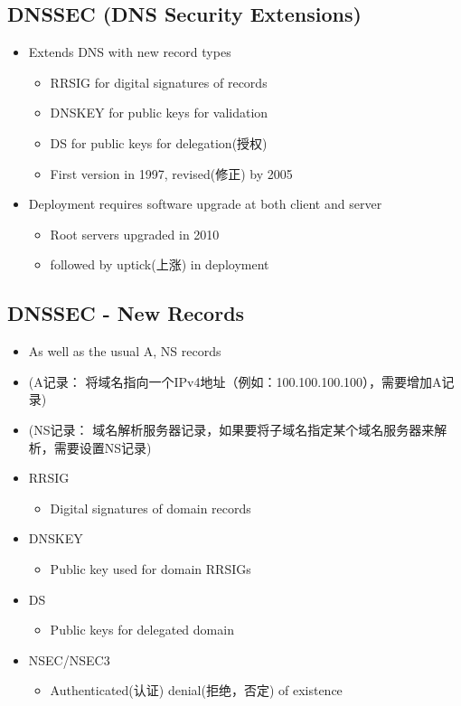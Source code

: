 \documentclass[12pt]{ctexart}   %
\begin{document}
	\subsection{DNSSEC (DNS Security Extensions)}
	\begin{itemize}
		\item Extends DNS with new record types 
		\begin{itemize}
			\item RRSIG for digital signatures of records
			\item DNSKEY for public keys for validation
			\item DS for public keys for delegation(授权)
			\item First version in 1997, revised(修正) by 2005
		\end{itemize}

		\item Deployment requires software upgrade at both client and server
		\begin{itemize}
			\item Root servers upgraded in 2010
			\item followed by uptick(上涨) in deployment
		\end{itemize}

	\end{itemize}

	\subsection{DNSSEC - New Records}
	\begin{itemize}
		\item As well as the usual A, NS records 
		\item (A记录： 将域名指向一个IPv4地址（例如：100.100.100.100），需要增加A记录)
		\item (NS记录： 域名解析服务器记录，如果要将子域名指定某个域名服务器来解析，需要设置NS记录)
		\item RRSIG
		\begin{itemize}
			\item Digital signatures of domain records
		\end{itemize}
		\item DNSKEY
		\begin{itemize}
			\item Public key used for domain RRSIGs
		\end{itemize}
		\item DS
		\begin{itemize}
			\item Public keys for delegated domain
		\end{itemize}
		\item NSEC/NSEC3
		\begin{itemize}
			\item Authenticated(认证) denial(拒绝，否定) of existence
		\end{itemize}
	\end{itemize}
\end{document}
